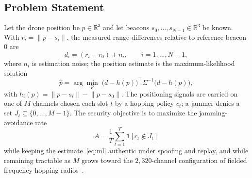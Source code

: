 \documentclass[journal]{IEEEtran}
\begin{document}
\subsection{Problem Statement}
Let the drone position be $p\in\mathbb{R}^3$ and let beacons
$s_0,\dots,s_{N-1}\in\mathbb{R}^3$ be known. With $r_i=\lVert p-s_i\rVert$, the
measured range differences relative to reference beacon $0$ are
\begin{equation}
d_i = (r_i - r_0) + n_i, \qquad i=1,\dots,N-1,
\label{eq:tdoa}
\end{equation}
where $n_i$ is estimation noise; the position estimate is the maximum-likelihood
solution
\begin{equation}
\hat p = \arg\min_{p}\; \big(d - h(p)\big)^{\!\top}\Sigma^{-1}\big(d - h(p)\big),
\label{eq:ml}
\end{equation}
with $h_i(p) = \lVert p-s_i\rVert - \lVert p-s_0\rVert$. The positioning
signals are carried on one of $M$ channels chosen each slot $t$ by a hopping
policy $c_t$; a jammer denies a set $J_t\subseteq\{0,\dots,M-1\}$. The security
objective is to maximize the jamming-avoidance rate
\begin{equation}
A = \frac1T\sum_{t=1}^{T}\mathbf{1}\!\left[c_t\notin J_t\right]
\label{eq:avoid}
\end{equation}
while keeping the estimate~\eqref{eq:ml} authentic under spoofing and replay,
and while remaining tractable as $M$ grows toward the $2{,}320$-channel
configuration of fielded frequency-hopping radios~\cite{ref17}.
\end{document}
